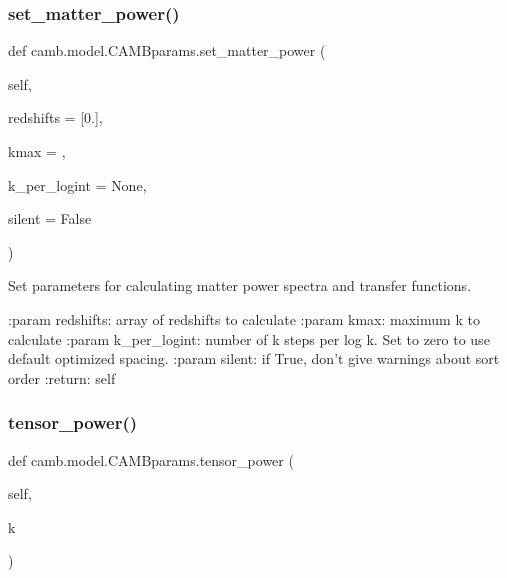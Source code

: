 \mbox{\label{classcamb_1_1model_1_1CAMBparams_a371e933413d954027320de731e4668cb}} 
\subsubsection{\texorpdfstring{set\+\_\+matter\+\_\+power()}{set\_matter\_power()}}
{\footnotesize\ttfamily def camb.\+model.\+C\+A\+M\+Bparams.\+set\+\_\+matter\+\_\+power (\begin{DoxyParamCaption}\item[{}]{self,  }\item[{}]{redshifts = {\ttfamily \mbox{[}0.\mbox{]}},  }\item[{}]{kmax = {},  }\item[{}]{k\+\_\+per\+\_\+logint = {\ttfamily None},  }\item[{}]{silent = {\ttfamily False} }\end{DoxyParamCaption})}

\begin{DoxyVerb}Set parameters for calculating matter power spectra and transfer functions.

:param redshifts: array of redshifts to calculate
:param kmax: maximum k to calculate
:param k_per_logint: number of k steps per log k. Set to zero to use default optimized spacing.
:param silent: if True, don't give warnings about sort order
:return:  self
\end{DoxyVerb}
 \mbox{\label{classcamb_1_1model_1_1CAMBparams_a846c38cbd0be48719f7ce15710e69523}} 
\subsubsection{\texorpdfstring{tensor\+\_\+power()}{tensor\_power()}}
{\footnotesize\ttfamily def camb.\+model.\+C\+A\+M\+Bparams.\+tensor\+\_\+power (\begin{DoxyParamCaption}\item[{}]{self,  }\item[{}]{k }\end{DoxyParamCaption})}



